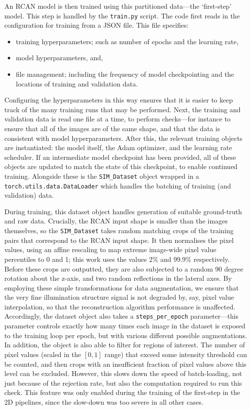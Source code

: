 \documentclass[12pt]{article}
\begin{document}
An RCAN model is then trained using this partitioned data---the `first-step' model.
This step is handled by the \texttt{train.py} script.
The code first reads in the configuration for training from a JSON file.
This file specifies:
\begin{itemize}
    \item training hyperparameters; such as number of epochs and the learning rate,
    \item model hyperparameters, and,
    \item file management; including the frequency of model checkpointing and the locations of training and validation data.
\end{itemize}
Configuring the hyperparameters in this way ensures that it is easier to keep track of the many training runs that may be performed.
Next, the training and validation data is read one file at a time, to perform checks---for instance to ensure that all of the images are of the same shape,
and that the data is consistent with model hyperparameters.
After this, the relevant training objects are instantiated: the model itself, the Adam optimizer, and the learning rate scheduler.
If an intermediate model checkpoint has been provided, all of these objects are updated to match the state of this checkpoint,
to enable continued training.
Alongside these is the \texttt{SIM\_Dataset} object wrapped in a \texttt{torch.utils.data.DataLoader} which handles the batching of training (and validation) data.

During training, this dataset object handles generation of suitable ground-truth and raw data.
Crucially, the RCAN input shape is smaller than the images themselves,
so the \texttt{SIM\_Dataset} takes random matching crops of the training pairs that correspond to the RCAN input shape.
It then normalises the pixel values, using an affine rescaling to map extreme image-wide pixel value percentiles to 0 and 1;
this work uses the values 2\% and 99.9\% respectively.
Before these crops are outputted, they are also subjected to a random 90 degree rotation about the z-axis,
and two random reflections in the lateral axes.
By employing these simple transformations for data augmentation,
we ensure that the very fine illumination structure signal is not degraded by, say, pixel value interpolation,
so that the reconstruction algorithm performance is unaffected.
Accordingly, the dataset object also takes a \texttt{steps\_per\_epoch} parameter---this
parameter controls exactly how many times each image in the dataset is exposed to the training loop per epoch,
but with various different possible augmentations.
In addition, the object is also able to filter for regions of interest.
The number of pixel values (scaled in the $[0, 1]$ range) that exceed some intensity threshold can be counted,
and then crops with an insufficient fraction of pixel values above this level can be excluded.
However, this slows down the speed of batch-loading, not just because of the rejection rate,
but also the computation required to run this check.
This feature was only enabled during the training of the first-step in the 2D pipelines,
since the slow-down was too severe in all other cases.
\end{document}
